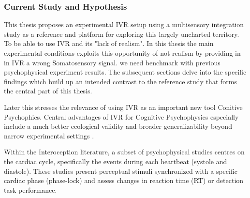 \documentclass[12pt,oneside,openright]{report}
\begin{document}

\subsubsection*{Current Study and Hypothesis}

This thesis proposes an experimental IVR setup using a multisensory integration study as a reference and platform for exploring this largely uncharted territory. To be able to use IVR and its "lack of realism". In this thesis the main experimental conditions exploits this opportunity of not realism by providing in in IVR a wrong Somatosensory signal. we need benchmark with previous psychophysical experiment results. The subsequent sections delve into the specific findings which build up an intended contrast to the reference study that forms the central part of this thesis. 

Later this stresses the relevance of using IVR as an important new tool Conitive Psychophics. Central advantages of IVR for Cognitive Psychophysics especially include a much better ecological validity and broader generalizability beyond narrow experimental settings \parencite{NASTASE2020117254}.

Within the Interoception literature, a subset of psychophysical studies centres on the cardiac cycle, specifically the events during each heartbeat (systole and diastole). These studies present perceptual stimuli synchronized with a specific cardiac phase (phase-lock) and assess changes in reaction time (RT) or detection task performance.    
\end{document}
